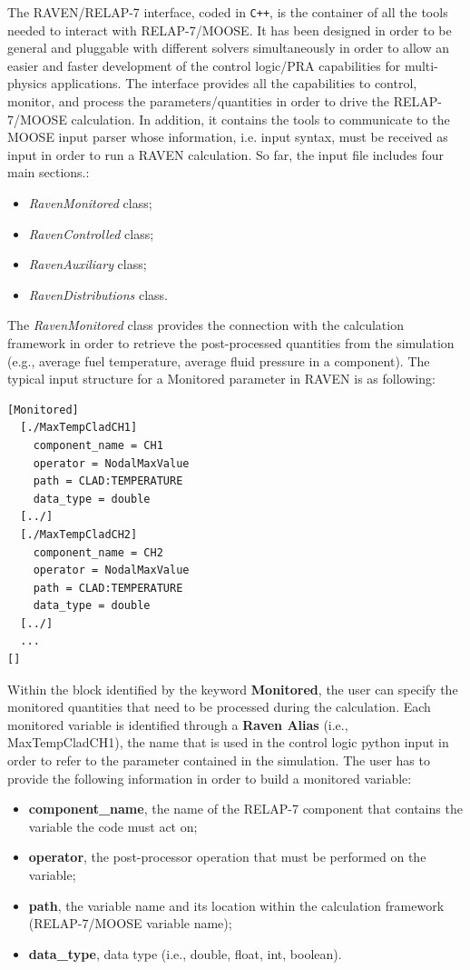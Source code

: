 \documentclass{mc2013}
\begin{document}
\label{sec:interface}
The RAVEN/RELAP-7 interface, coded in \verb!C++!, is the container of all the tools needed to interact with RELAP-7/MOOSE. It has been designed in order to be general and pluggable with different solvers simultaneously in order to allow an easier and faster development of the control logic/PRA capabilities for multi-physics applications.
The interface provides all the capabilities to control, monitor, and process the parameters/quantities in order to drive the RELAP-7/MOOSE calculation. In addition, it contains the tools to communicate to the MOOSE input parser whose information, i.e. input syntax, must be received as input in order to run a RAVEN  calculation. So far, the input file includes four main sections.:
\begin{itemize}
\item \emph{RavenMonitored} class;
\item \emph{RavenControlled} class;
\item \emph{RavenAuxiliary} class;
\item \emph{RavenDistributions} class.
\end{itemize}
The \emph{RavenMonitored} class provides the connection with the calculation framework in order to retrieve the post-processed quantities from the simulation (e.g., average fuel temperature, average fluid pressure in a component). The typical input structure for a Monitored parameter in RAVEN is as following:
\begin{lstlisting}
[Monitored]
  [./MaxTempCladCH1]
    component_name = CH1
    operator = NodalMaxValue
    path = CLAD:TEMPERATURE
    data_type = double
  [../]
  [./MaxTempCladCH2]
    component_name = CH2
    operator = NodalMaxValue
    path = CLAD:TEMPERATURE
    data_type = double
  [../]
  ...
[]
\end{lstlisting}
Within the block identified by the keyword \textbf{Monitored}, the user can specify the monitored quantities that need to be processed during the calculation. Each monitored variable is identified through a \textbf{Raven Alias} (i.e., MaxTempCladCH1), the name that is used in the control logic python input in order to refer to the parameter contained in the simulation.
The user has to provide the following information in order to build a monitored variable:
\begin{itemize}
  \item \textbf{component\_name}, the name of the RELAP-7 component that contains the variable the code must act on;
  \item \textbf{operator}, the post-processor operation that must be performed on the variable;
  \item \textbf{path}, the variable name and its location within the calculation framework (RELAP-7/MOOSE variable name);
  \item \textbf{data\_type}, data type (i.e., double, float, int, boolean).
\end{itemize}
\end{document}
